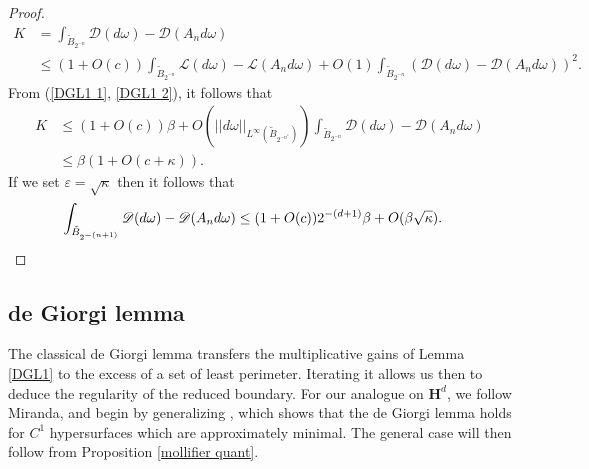 \documentclass[reqno,12pt,letterpaper]{amsart}
\newcommand{\Hyp}{\mathbf H}
\newcommand{\Lagrange}{\mathscr L}
\newcommand{\DirL}{\mathscr D}
\theoremstyle{definition}
\numberwithin{equation}{section}
\begin{document}
\begin{proof}
\begin{align*}
K &= \int_{\tilde B_{2^{-n}}} \DirL(d\omega) - \DirL(A_n d\omega) \\
&\leq (1 + O(c)) \int_{\tilde B_{2^{-n}}} \Lagrange(d\omega) - \Lagrange(A_n d\omega) + O(1) \int_{\tilde B_{2^{-n}}} (\DirL(d\omega) - \DirL(A_n d\omega))^2.
\end{align*}
From (\ref{DGL1 1}, \ref{DGL1 2}), it follows that
\begin{align*}
K &\leq (1 + O(c))\beta + O(||d\omega||_{L^\infty(\tilde B_{2^{-n^*}})}) \int_{\tilde B_{2^{-n}}} \DirL(d\omega) - \DirL(A_n d\omega)\\
&\leq \beta(1 + O(c + \kappa)).
\end{align*}
If we set $\varepsilon = \sqrt \kappa$ then it follows that
\begin{align*}
\int_{\tilde B_{2^{-(n+1)}}} \DirL(d\omega) - \DirL(A_n d\omega) &\leq (1 + O(c)) 2^{-(d + 1)} \beta + O(\beta \sqrt \kappa). \qedhere
\end{align*}
\end{proof}


\subsection{de Giorgi lemma}
The classical de Giorgi lemma \cite{deGiorgi61} transfers the multiplicative gains of Lemma \ref{DGL1} to the excess of a set of least perimeter.
Iterating it allows us then to deduce the regularity of the reduced boundary.
For our analogue on $\Hyp^d$, we follow Miranda, and begin by generalizing \cite[Teorema 4.4]{Miranda66}, which shows that the de Giorgi lemma holds for $C^1$ hypersurfaces which are approximately minimal.
The general case will then follow from Proposition \ref{mollifier quant}.
\end{document}
